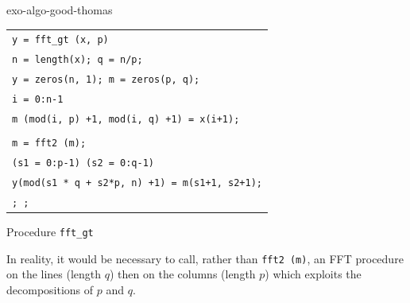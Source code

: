 \begin{correction}{exo-algo-good-thomas}
\begin{enumerate}
\begin{listing} 
\begin{footnotesize} 
{\upshape
\begin{tabular}{l} \texttt{\pfunction y = fft\_gt (x, p)} \\
\texttt{n = length(x); q = n/p;} \\
\texttt{y = zeros(n, 1); m = zeros(p, q);} \\
\texttt{\pfor i = 0:n-1} \\
\texttt{\quad m (mod(i, p) +1, mod(i, q) +1) = x(i+1);} \\
\texttt{\pend} \\
\texttt{m = fft2 (m);} \\
\texttt{\pfor{}(s1 = 0:p-1) \pfor{}(s2 = 0:q-1)} \\
\quad \texttt{y(mod(s1 * q + s2*p, n) +1) = m(s1+1, s2+1);} \\
\texttt{\pend{}; \pend{};} \\
\end{tabular}
}
\end{footnotesize}
\caption{Procedure \texttt{\upshape fft\_gt}}
\label{listing-fftgt}
\end{listing}

In reality, it would be necessary to call, rather than \texttt{\upshape fft2 (m)}, an FFT procedure on the lines (length $ q $) then on the columns (length $ p $) which exploits the decompositions of $ p $ and $ q $.
\end{enumerate}
\end{correction}
 
